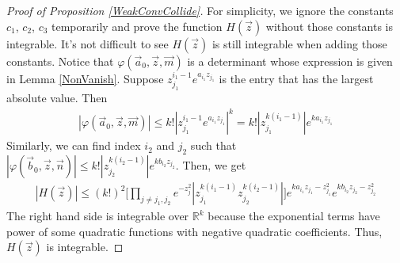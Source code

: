 \begin{proof}[Proof of Proposition \ref{WeakConvCollide}]
For simplicity, we ignore the constants $c_{1}$, $c_{2}$, $c_{3}$ temporarily and prove the function $H(\vec{z})$ without those constants is integrable. It's not difficult to see $H(\vec{z})$ is still integrable when adding those constants. Notice that $\varphi(\vec{a}_{0},\vec{z},\vec{m})$ is a determinant whose expression is given in Lemma \ref{NonVanish}. Suppose $z_{j_1}^{i_1-1}e^{a_{i_1}z_{j_1}}$ is the entry that has the largest absolute value. Then 
\begin{align*}
	|\varphi(\vec{a}_{0},\vec{z},\vec{m})|\leqslant k!|z_{j_{1}}^{i_{1}-1}e^{a_{i_1}z_{j_1}}|^{k}=k!|z_{j_1}^{k(i_1-1)}|e^{ka_{i_1}z_{j_1}}
\end{align*}
Similarly, we can find index $i_2$ and $j_{2}$ such that $|\varphi(\vec{b}_{0},\vec{z},\vec{n})|\leqslant k!|z_{j_2}^{k(i_2-1)}|e^{kb_{i_2}z_{j_2}}$. Then, we get 
\begin{align*}
	|H(\vec{z})|\leqslant (k!)^{2}\big[\prod_{j\neq j_1,j_2}e^{-z_{j}^{2}}|z_{j_1}^{k(i_1-1)}z_{j_2}^{k(i_2-1)}|\big]e^{ka_{i_1}z_{j_1}-z_{j_1}^2}e^{kb_{i_2}z_{j_2}-z_{j_2}^{2}}
\end{align*}
The right hand side is integrable over $\mathbb{R}^{k}$ because the exponential terms have power of some quadratic functions with negative quadratic coefficients. Thus, $H(\vec{z})$ is integrable.


\end{proof}
